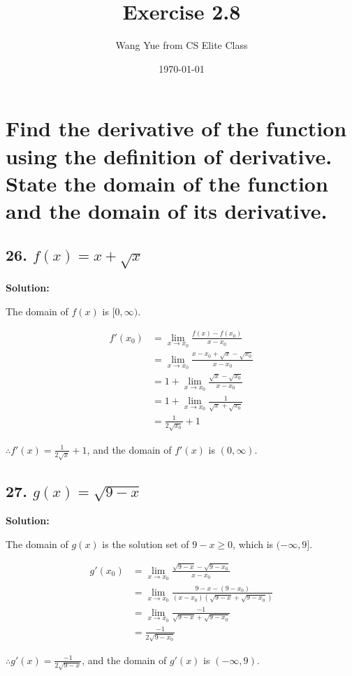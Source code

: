 \documentclass{article}
\newenvironment{solution}{
    \par \textbf{Solution: } \quad \par
}{\par}
\begin{document}
    \title{Exercise 2.8}
    \author{Wang Yue from CS Elite Class}
    \date{\today}

    \maketitle

    \section*{Find the derivative of the function using the definition of derivative. State the domain of the function and the domain of its derivative.}

    \subsection*{26. $f(x) = x + \sqrt{x}$}

    \begin{solution}
        The domain of $f(x)$ is $[0, \infty)$.

        $$
        \begin{aligned}
            f'(x_0) &= \lim_{x \to x_0}\frac{f(x) - f(x_0)}{x - x_0} \\
            &= \lim_{x \to x_0}\frac{x - x_0 + \sqrt{x} - \sqrt{x_0}}{x - x_0} \\
            &= 1 + \lim_{x \to x_0}\frac{\sqrt{x} - \sqrt{x_0}}{x - x_0} \\
            &= 1 + \lim_{x \to x_0}\frac{1}{\sqrt{x} + \sqrt{x_0}} \\
            &= \frac{1}{2\sqrt{x_0}} + 1
        \end{aligned}
        $$

        $\therefore f'(x) = \frac{1}{2\sqrt{x}} + 1$, and the domain of $f'(x)$ is $(0, \infty)$.
    \end{solution}

    \subsection*{27. $g(x) = \sqrt{9 - x}$}

    \begin{solution}
        The domain of $g(x)$ is the solution set of $9 - x \geq 0$, which is $(-\infty, 9]$.

        $$
        \begin{aligned}
            g'(x_0) &= \lim_{x \to x_0}\frac{\sqrt{9 - x} - \sqrt{9 - x_0}}{x - x_0} \\
            &= \lim_{x \to x_0}\frac{9 - x - (9 - x_0)}{(x - x_0)(\sqrt{9 - x} + \sqrt{9 - x_0})} \\
            &= \lim_{x \to x_0}\frac{-1}{\sqrt{9 - x} + \sqrt{9 - x_0}} \\
            &= \frac{-1}{2\sqrt{9 - x_0}}
        \end{aligned}
        $$

        $\therefore g'(x) = \frac{-1}{2\sqrt{9 - x}}$, and the domain of $g'(x)$ is $(-\infty, 9)$.
    \end{solution}
\end{document}
